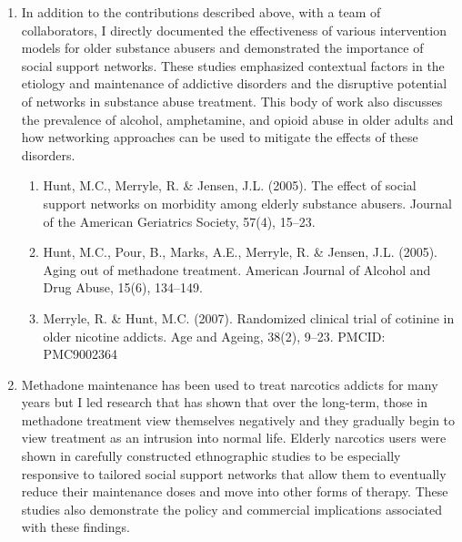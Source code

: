\documentclass{nihbiosketch}
\begin{document}
\begin{enumerate}
\begin{enumerate}
\end{enumerate}


\item In addition to the contributions described above, with a team of
    collaborators, I directly documented the effectiveness of various
    intervention models for older substance abusers and demonstrated the
    importance of social support networks.   These studies emphasized
    contextual factors in the etiology and maintenance of addictive disorders
    and the disruptive potential of networks in substance abuse treatment. This
    body of work also discusses the prevalence of alcohol, amphetamine, and
    opioid abuse in older adults and how networking approaches can be used to
    mitigate the effects of these disorders.    

\begin{enumerate}

\item Hunt, M.C., Merryle, R. \& Jensen, J.L. (2005). The effect of social
        support networks on morbidity among elderly substance abusers. Journal
        of the American Geriatrics Society, 57(4), 15--23.

\item Hunt, M.C., Pour, B., Marks, A.E., Merryle, R. \& Jensen, J.L. (2005).
        Aging out of methadone treatment. American Journal of Alcohol and Drug
        Abuse, 15(6), 134--149. 

\item Merryle, R. \& Hunt, M.C. (2007). Randomized clinical trial of cotinine
        in older nicotine addicts. Age and Ageing, 38(2), 9--23. PMCID:
        PMC9002364

\end{enumerate}

\item Methadone maintenance has been used to treat narcotics addicts for many
    years but I led research that  has shown that over the long-term, those in
    methadone treatment view themselves negatively and they gradually begin to
    view treatment as an intrusion into normal life.   Elderly narcotics users
    were shown in carefully constructed ethnographic studies to be especially
    responsive to tailored social support networks that allow them to
    eventually reduce their maintenance doses and move into other forms of
    therapy.  These studies also demonstrate the policy and commercial
    implications associated with these findings.

\begin{enumerate}   


\end{enumerate}
\end{enumerate}
\end{document}
